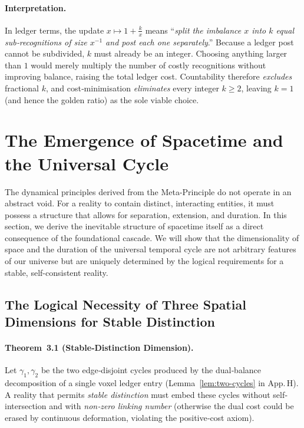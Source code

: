 \paragraph{Interpretation.}
In ledger terms, the update
\(x\mapsto1+\tfrac{k}{x}\) means “\emph{split the imbalance \(x\)
into \(k\) equal sub‑recognitions of size \(x^{-1}\) and post each
one separately}.”
Because a ledger post cannot be subdivided, \(k\) must already be an
integer.  
Choosing anything larger than \(1\) would merely multiply the number
of costly recognitions without improving balance, raising the total
ledger cost.  
Countability therefore \emph{excludes} fractional \(k\), and
cost‑minimisation \emph{eliminates} every integer \(k\ge2\),
leaving \(k=1\) (and hence the golden ratio) as the sole viable
choice.


\section{The Emergence of Spacetime and the Universal Cycle}

The dynamical principles derived from the Meta-Principle do not operate in an abstract void. For a reality to contain distinct, interacting entities, it must possess a structure that allows for separation, extension, and duration. In this section, we derive the inevitable structure of spacetime itself as a direct consequence of the foundational cascade. We will show that the dimensionality of space and the duration of the universal temporal cycle are not arbitrary features of our universe but are uniquely determined by the logical requirements for a stable, self-consistent reality.

\subsection{The Logical Necessity of Three Spatial Dimensions for Stable Distinction}

\paragraph{Theorem 3.1 (Stable‐Distinction Dimension).}
Let $\gamma_{1},\gamma_{2}$ be the two edge‐disjoint cycles produced by the
dual‐balance decomposition of a single voxel ledger entry
(Lemma \ref{lem:two-cycles} in App.\,H).
A reality that permits \emph{stable distinction} must embed these cycles
without self‐intersection and with \emph{non‑zero linking number} 
(otherwise the dual cost could be erased by continuous deformation,
violating the positive‐cost axiom).

